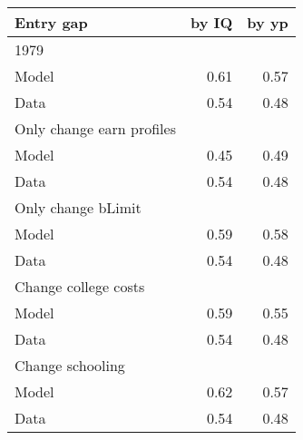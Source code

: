 \begin{tabular}{lrr}
\hline
Entry gap & by IQ  & by yp  \\ 
\hline
1979 &   &   \\ 
Model & 0.61  & 0.57  \\ 
Data & 0.54  & 0.48  \\ 
Only change earn profiles &   &   \\ 
Model & 0.45  & 0.49  \\ 
Data & 0.54  & 0.48  \\ 
Only change bLimit &   &   \\ 
Model & 0.59  & 0.58  \\ 
Data & 0.54  & 0.48  \\ 
Change college costs &   &   \\ 
Model & 0.59  & 0.55  \\ 
Data & 0.54  & 0.48  \\ 
Change schooling &   &   \\ 
Model & 0.62  & 0.57  \\ 
Data & 0.54  & 0.48  \\ 
\hline
\end{tabular}%
